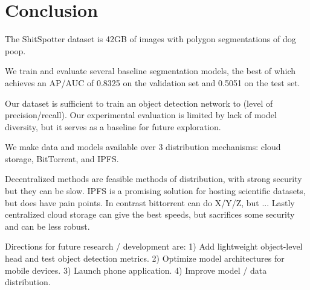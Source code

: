 \documentclass[10pt,twocolumn,letterpaper]{article}
\begin{document}
\section{Conclusion}

The ShitSpotter dataset is 42GB of images with polygon segmentations of dog
poop. 

We train and evaluate several baseline segmentation models, the best of which
achieves an AP/AUC of 0.8325 on the validation set and 0.5051 on the test set.

Our dataset is sufficient to train an object detection network to (level of
precision/recall).
Our experimental evaluation is limited by lack of model diversity, but it
serves as a baseline for future exploration.

We make data and models available over 3 distribution mechanisms: 
cloud storage, BitTorrent, and IPFS.

Decentralized methods are feasible methods of distribution, with strong
security but they can be slow.
IPFS is a promising solution for hosting scientific datasets, but does have pain points.
In contrast bittorrent can do X/Y/Z, but ...
Lastly centralized cloud storage can give the best speeds, but sacrifices some
security and can be less robust.

Directions for future research / development are:
1) Add lightweight object-level head and test object detection metrics.
2) Optimize model architectures for mobile devices.
3) Launch phone application.
4) Improve model / data distribution.


{\small


}
%
\end{document}
